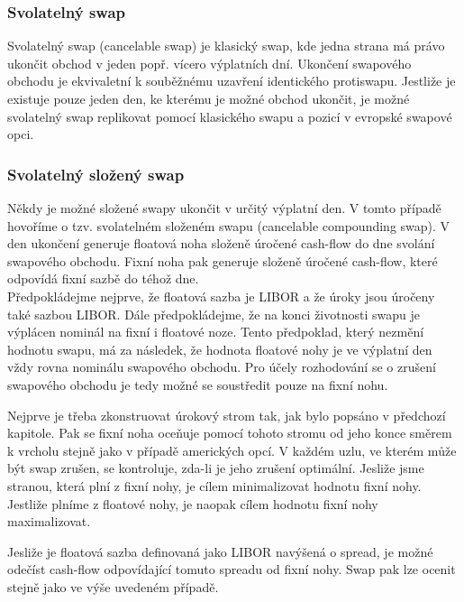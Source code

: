\documentclass[a4paper]{book}
\begin{document}
\subsubsection{Svolatelný swap}

Svolatelný swap (cancelable swap) je  klasický swap, kde jedna strana má právo ukončit obchod v jeden popř. vícero výplatních dní. Ukončení swapového obchodu je ekvivaletní k souběžnému uzavření identického protiswapu. Jestliže je existuje pouze jeden den, ke kterému je možné obchod ukončit, je možné svolatelný swap replikovat pomocí klasického swapu a pozicí v evropské swapové opci.

\subsubsection{Svolatelný složený swap}

Někdy je možné složené swapy ukončit v určitý výplatní den. V tomto případě hovoříme o tzv. svolatelném složeném swapu (cancelable compounding swap). V den ukončení generuje floatová noha složeně úročené cash-flow do dne svolání swapového obchodu. Fixní noha pak generuje složeně úročené cash-flow, které odpovídá fixní sazbě do téhož dne.\\

Předpokládejme nejprve, že floatová sazba je LIBOR a že úroky jsou úročeny také sazbou LIBOR. Dále předpokládejme, že na konci životnosti swapu je výplácen nominál na fixní i floatové noze. Tento předpoklad, který nezmění hodnotu swapu, má za následek, že hodnota floatové nohy je ve výplatní den vždy rovna nominálu swapového obchodu. Pro účely rozhodování se o zrušení swapového obchodu je tedy možné se soustředit pouze na fixní nohu.

Nejprve je třeba zkonstruovat úrokový strom tak, jak bylo popsáno v předchozí kapitole. Pak se fixní noha oceňuje pomocí tohoto stromu od jeho konce směrem k vrcholu stejně jako v případě amerických opcí. V každém uzlu, ve kterém může být swap zrušen, se kontroluje, zda-li je jeho zrušení optimální. Jesliže jsme stranou, která plní z fixní nohy, je cílem minimalizovat hodnotu fixní nohy. Jestliže plníme z floatové nohy, je naopak cílem hodnotu fixní nohy maximalizovat.

Jesliže je floatová sazba definovaná jako LIBOR navýšená o spread, je možné odečíst cash-flow odpovídající tomuto spreadu od fixní nohy. Swap pak lze ocenit stejně jako ve výše uvedeném případě.
\end{document}
